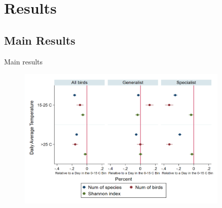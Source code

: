 \documentclass[handout]{beamer}
\begin{document}
\section{Results}

\subsection{Main Results}

\begin{frame}{Main results}
  \begin{figure}[h]
  \centering
  \includegraphics[width=0.9\textwidth]{result_mreasure1.png}
  \end{figure}
\end{frame}
\end{document}
